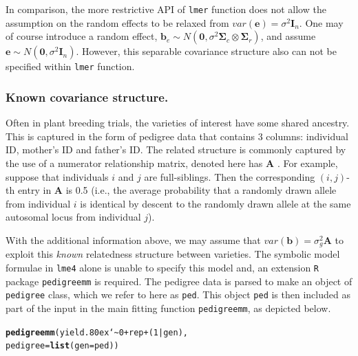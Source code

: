 \documentclass[runningheads]{llncs}\usepackage[]{graphicx}\usepackage[]{color}
\makeatletter
\newcommand{\hlnum}[1]{\textcolor[rgb]{0.686,0.059,0.569}{#1}}%
\newcommand{\hlopt}[1]{\textcolor[rgb]{0,0,0}{#1}}%
\newcommand{\hlstd}[1]{\textcolor[rgb]{0.345,0.345,0.345}{#1}}%
\newcommand{\hlkwc}[1]{\textcolor[rgb]{0.333,0.667,0.333}{#1}}%
\newcommand{\hlkwd}[1]{\textcolor[rgb]{0.737,0.353,0.396}{\textbf{#1}}}%
\newenvironment{kframe}{%
 \def\at@end@of@kframe{}%
 \ifinner\ifhmode%
  \def\at@end@of@kframe{\end{minipage}}%
  \begin{minipage}{\columnwidth}%
 \fi\fi%
 \def\FrameCommand##1{\hskip\@totalleftmargin \hskip-\fboxsep
 \colorbox{shadecolor}{##1}\hskip-\fboxsep
     \hskip-\linewidth \hskip-\@totalleftmargin \hskip\columnwidth}%
 \MakeFramed {\advance\hsize-\width
   \@totalleftmargin\z@ \linewidth\hsize
   \@setminipage}}%
 {\par\unskip\endMakeFramed%
 \at@end@of@kframe}
\newenvironment{knitrout}{}{} %
\newcommand{\mytilde}{\lower.80ex\hbox{\char`\~}}
\makeatother
\begin{document}
In comparison, the more restrictive API of \texttt{lmer} function does not allow the assumption on the random effects to be relaxed from $var(\boldsymbol{e}) = \sigma^2\mathbf{I}_n$. One may of course introduce a random effect, $\boldsymbol{b}_e \sim N(\boldsymbol{0}, \sigma^2\mathbf{\Sigma}_c\otimes \mathbf{\Sigma}_r)$, and assume $\boldsymbol{e} \sim N(\boldsymbol{0}, \sigma^2\mathbf{I}_n)$. However, this separable covariance structure also can not be specified within \texttt{lmer} function.



\subsubsection{Known covariance structure.} 

Often in plant breeding trials, the varieties of interest have some shared ancestry. This is captured in the form of pedigree data that contains 3 columns: individual ID, mother's ID and father's ID. The related structure is commonly captured by the use of a numerator relationship matrix, denoted here has $\mathbf{A}$ \citep{Mrode2014}. For example, suppose that individuals $i$ and $j$ are full-siblings. Then the corresponding $(i,j)$-th entry in $\mathbf{A}$ is 0.5 (i.e., the average probability that a randomly drawn allele from individual $i$ is identical by descent to the randomly drawn allele at the same autosomal locus from individual $j$). 

With the additional information above, we may assume that $var(\boldsymbol{b}) = \sigma^2_g \mathbf{A}$ to exploit this \textit{known} relatedness structure between varieties. The symbolic model formulae in \texttt{lme4} alone is unable to specify this model and, an extension \texttt{R} package \texttt{pedigreemm} \citep{pedigreemm-paper} is required. The pedigree data is parsed to make an object of \texttt{pedigree} class, which we refer to here as \texttt{ped}. This object \texttt{ped} is then included as part of the input in the main fitting function \texttt{pedigreemm}, as depicted below.

\begin{knitrout}
	\color{fgcolor}\begin{kframe}
		\begin{alltt}
			\hlkwd{pedigreemm}\hlstd{(yield} \hlopt{\mytilde} \hlnum{0} \hlopt{+} \hlstd{rep} \hlopt{+} \hlstd{(}\hlnum{1} \hlopt{|} \hlstd{gen),}
			\hlkwc{pedigree} \hlstd{=} \hlkwd{list}\hlstd{(}\hlkwc{gen} \hlstd{= ped))}
		\end{alltt}
	\end{kframe}
\end{knitrout}
\end{document}
